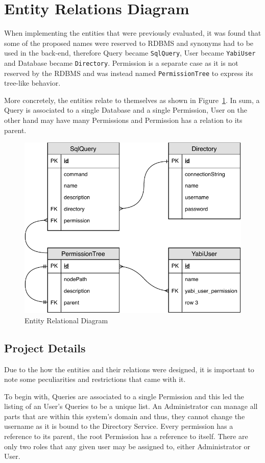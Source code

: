 \section{Entity Relations Diagram}\label{tities}
When implementing the entities that were previously evaluated, it was found that some of the proposed names were reserved to \gls{RDBMS} and synonyms had to be used in the back-end, therefore Query became \texttt{SqlQuery}, User became \texttt{YabiUser} and Database became \texttt{Directory}. Permission is a separate case as it is not reserved by the \gls{RDBMS} and was instead named \texttt{PermissionTree} to express its tree-like behavior.

More concretely, the entities relate to themselves as shown in Figure~\ref{fig:er}. In sum, a Query is associated to a single Database and a single Permission, User on the other hand may have many Permissions and Permission has a relation to its parent.

\begin{figure}
  \centering
  \includegraphics[width=.7\textwidth]{images/diagramas/er}
  \caption{Entity Relational Diagram}\label{fig:er}
\end{figure}

\subsection{Project Details}
Due to the how the entities and their relations were designed, it is important to note some peculiarities and restrictions that came with it.

To begin with, Queries are associated to a single Permission and this led the listing of an User's Queries to be a unique list. An Administrator can manage all parts that are within this system's domain and thus, they cannot change the username as it is bound to the Directory Service. Every permission has a reference to its parent, the root Permission has a reference to itself. There are only two roles that any given user may be assigned to, either Administrator or User.
